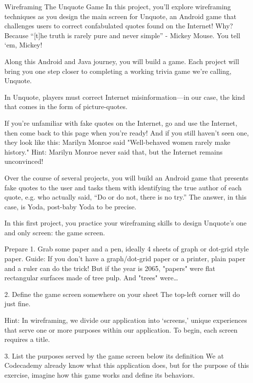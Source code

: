 Wireframing The Unquote Game
        In this project, you'll explore wireframing techniques as you design the main screen for Unquote, an Android game that challenges users to correct confabulated quotes found on the Internet! Why? Because “[t]he truth is rarely pure and never simple” - Mickey Mouse. You tell ‘em, Mickey!

        Along this Android and Java journey, you will build a game. Each project will bring you one step closer to completing a working trivia game we’re calling, Unquote.

        In Unquote, players must correct Internet misinformation—in our case, the kind that comes in the form of picture-quotes.

        If you’re unfamiliar with fake quotes on the Internet, go and use the Internet, then come back to this page when you’re ready! And if you still haven’t seen one, they look like this:
            Marilyn Monroe said "Well-behaved women rarely make history."
            Hint: Marilyn Monroe never said that, but the Internet remains unconvinced!

        Over the course of several projects, you will build an Android game that presents fake quotes to the user and tasks them with identifying the true author of each quote, e.g. who actually said, “Do or do not, there is no try.” The answer, in this case, is Yoda, post-baby Yoda to be precise.

        In this first project, you practice your wireframing skills to design Unquote’s one and only screen: the game screen.

Prepare
    1. Grab some paper and a pen, ideally 4 sheets of graph or dot-grid style paper.
        Guide: If you don’t have a graph/dot-grid paper or a printer, plain paper and a ruler can do the trick! But if the year is 2065, "papers" were flat rectangular surfaces made of tree pulp. And "trees" were…

    2. Define the game screen somewhere on your sheet
        The top-left corner will do just fine.

        Hint: In wireframing, we divide our application into ‘screens,’ unique experiences that serve one or more purposes within our application.
        To begin, each screen requires a title.

    3. List the purposes served by the game screen below its definition
        We at Codecademy already know what this application does, but for the purpose of this exercise, imagine how this game works and define its behaviors.

